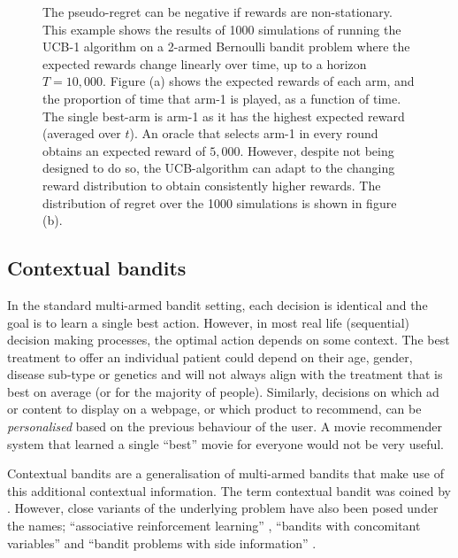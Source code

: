 \documentclass[11pt,a4paper,twoside]{report}
\newcommand{\quotes}[1]{``#1''}
\theoremstyle{plain}
\theoremstyle{definition}
\begin{document}
\begin{figure}[ht]
\begin{subfigure}[t]{0.49\textwidth}
    \end{subfigure}
      \caption{The pseudo-regret can be negative if rewards are non-stationary. This example shows the results of 1000 simulations of running the UCB-1 algorithm on a 2-armed Bernoulli bandit problem where the expected rewards change linearly over time, up to a horizon $T=10,000$. Figure (a) shows the expected rewards of each arm, and the proportion of time that arm-1 is played, as a function of time. The single best-arm is arm-1 as it has the highest expected reward (averaged over $t$). An oracle that selects arm-1 in every round obtains an expected reward of $5,000$. However, despite not being designed to do so, the UCB-algorithm can adapt to the changing reward distribution to obtain consistently higher rewards. The distribution of regret over the 1000 simulations is shown in figure (b).}\label{fig:non-stationary-bandit}
\end{figure}

\subsection{Contextual bandits}
\label{sec:contextual-bandits}

In the standard multi-armed bandit setting, each decision is identical and the goal is to learn a single best action. However, in most real life (sequential) decision making processes, the optimal action depends on some context. The best treatment to offer an individual patient could depend on their age, gender, disease sub-type or genetics and will not always align with the treatment that is best on average (or for the majority of people).  Similarly, decisions on which ad or content to display on a webpage, or which product to recommend, can be \emph{personalised} based on the previous behaviour of the user. A movie recommender system that learned a single \quotes{best} movie for everyone would not be very useful. 

Contextual bandits are a generalisation of multi-armed bandits that make use of this additional contextual information. The term contextual bandit was coined by \citet{Langford2008}. However, close variants of the underlying problem have also been posed under the names; \quotes{associative reinforcement learning} \citep{kaelbling1994associative}, \quotes{bandits with concomitant variables}\citep{woodroofe1979one} and  \quotes{bandit problems with side information} \citep{wang2005bandit}. 
\end{document}

